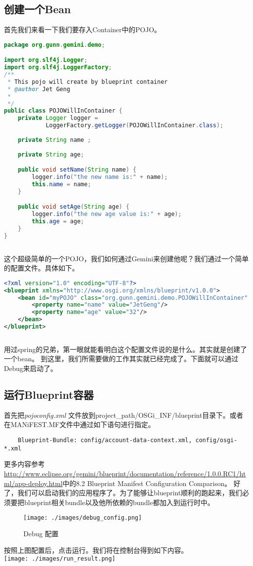 \documentclass[a4paper,11pt,onecolumn,oneside]{article}
\begin{document}
\subsection{创建一个Bean}
首先我们来看一下我们要存入Container中的POJO。
\begin{lstlisting}[keywordstyle=\color{blue!70}, commentstyle=\color{red!50!green!50!blue!50} , language=Java, caption={POJOWillInContainer.java}]
package org.gunn.gemini.demo;

import org.slf4j.Logger;
import org.slf4j.LoggerFactory;
/**
 * This pojo will create by blueprint container
 * @author Jet Geng 
 *
 */
public class POJOWillInContainer {
    private Logger logger = 
            LoggerFactory.getLogger(POJOWillInContainer.class);
    
    private String name ;
    
    private String age;

    public void setName(String name) {
        logger.info("the new name is:" + name);
        this.name = name;
    }

    public void setAge(String age) {
        logger.info("the new age value is:" + age);
        this.age = age;
    }
}
    
\end{lstlisting}
这个超级简单的一个POJO，我们如何通过Gemini来创建他呢？我们通过一个简单的配置文件。具体如下。
\begin{lstlisting}[language=Xml,caption={pojoconfig.xml}]
<?xml version="1.0" encoding="UTF-8"?>
<blueprint xmlns="http://www.osgi.org/xmlns/blueprint/v1.0.0">
	<bean id="myPOJO" class="org.gunn.gemini.demo.POJOWillInContainer" >
		<property name="name" value="JetGeng"/>
		<property name="age" value="32"/>
	</bean>
</blueprint>
    
\end{lstlisting}
用过spring的兄弟，第一眼就能看明白这个配置文件说的是什么。其实就是创建了一个bean。
到这里，我们所需要做的工作其实就已经完成了。下面就可以通过Debug来启动了。
\subsection{运行Blueprint容器}
首先把\emph{pojoconfig.xml} 文件放到project\_path/OSGi\_INF/blueprint目录下。或者在MANiFEST.MF文件中通过如下语句进行指定。
\begin{lstlisting}
    Blueprint-Bundle: config/account-data-context.xml, config/osgi-*.xml 
\end{lstlisting}
更多内容参考\url{http://www.eclipse.org/gemini/blueprint/documentation/reference/1.0.0.RC1/html/app-deploy.html}中的8.2 Blueprint Manifest Configuration Comparison。
好了，我们可以启动我们的应用程序了。为了能够让blueprint顺利的跑起来，我们必须要把blueprint相关bundle以及他所依赖的bundle都加入到运行时中。
\begin{figure}[h!]
  \caption{Debug 配置}
  \centering
    \texttt{[image: ./images/debug\_config.png]}
\end{figure}
按照上图配置后，点击运行。我们将在控制台得到如下内容。\\
\texttt{[image: ./images/run\_result.png]}
\end{document}

